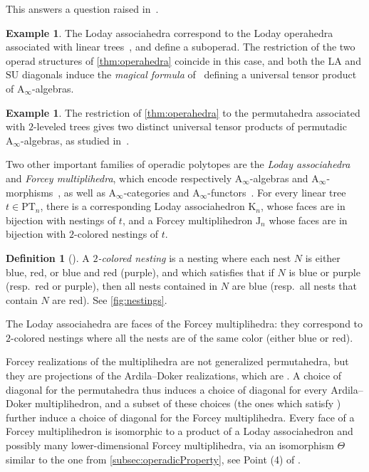 \documentclass{amsart}
\newcommand{\darkblue}{\color{darkblue}} %
\theoremstyle{definition}
\newtheorem{definition}[theorem]{Definition}
\newtheorem{example}[theorem]{Example}
\newcommand{\PT}{\mathrm{PT}} %
\newcommand{\K}{\mathrm{K}} %
\newcommand{\J}{\mathrm{J}} %
\newcommand{\resp}{resp.~} %
\newcommand{\defn}[1]{\textsl{\darkblue #1}} %
\newcommand{\SU}{\mathrm{SU}}
\newcommand{\LA}{\mathrm{LA}}
\newcommand{\Ainf}{\ensuremath{\mathrm{A}_\infty}}
\begin{document}
This answers a question raised in~\cite[Rem.~3.14]{LaplanteAnfossi}.

\begin{example}
The Loday associahedra correspond to the Loday operahedra associated with linear trees~\cite[Sect. 2.2]{LaplanteAnfossi}, and define a suboperad.
The restriction of the two operad structures of \cref{thm:operahedra} coincide in this case, and both the $\LA$ and $\SU$ diagonals induce the \emph{magical formula} of~\cite{MarklShnider, MasudaThomasTonksVallette, SaneblidzeUmble-comparingDiagonals} defining a universal tensor product of $\Ainf$-algebras. 
\end{example}

\begin{example}
The restriction of \cref{thm:operahedra} to the permutahedra associated with $2$-leveled trees gives two distinct universal tensor products of permutadic $\Ainf$-algebras, as studied in~\cite{LodayRonco-permutads,Markl}.
\end{example}

Two other important families of operadic polytopes are the \emph{Loday associahedra} and \emph{Forcey multiplihedra}, which encode respectively $\Ainf$-algebras and $\Ainf$-morphisms~\cite[Prop.~4.9]{LaplanteAnfossiMazuir}, as well as $\Ainf$-categories and $\Ainf$-functors~\cite[Sect.~4.3]{LaplanteAnfossiMazuir}.
For every linear tree $t \in \PT_n$, there is a corresponding Loday associahedron $\K_n$, whose faces are in bijection with nestings of $t$, and a Forcey multiplihedron $\J_n$ whose faces are in bijection with $2$-colored nestings of $t$.

\begin{definition}[{\cite[Def. 3.2]{LaplanteAnfossiMazuir}}]\label{def:2-Colored Nesting}
	A \defn{$2$-colored nesting} is a nesting where each nest $N$ is either blue, red, or blue and red (purple), and which satisfies that if $N$ is blue or purple (\resp red or purple), then all nests contained in $N$ are blue (\resp all nests that contain $N$ are red). 
 	See \cref{fig:nestings}.
\end{definition}

The Loday associahedra are faces of the Forcey multiplihedra: they correspond to $2$-colored nestings where all the nests are of the same color (either blue or red). 

Forcey realizations of the multiplihedra are not generalized permutahedra, but they are projections of the Ardila--Doker realizations, which are \cite[Prop. 1.16]{LaplanteAnfossiMazuir}.
A choice of diagonal for the permutahedra thus induces a choice of diagonal for every Ardila--Doker multiplihedron, and a subset of these choices (the ones which satisfy \cite[Prop. 2.7 \& 2.8]{LaplanteAnfossiMazuir}) further induce a choice of diagonal for the Forcey multiplihedra.
Every face of a Forcey multiplihedron is isomorphic to a product of a Loday associahedron and possibly many lower-dimensional Forcey multiplihedra, via an isomorphism $\Theta$ similar to the one from \cref{subsec:operadicProperty}, see Point (4) of \cite[Prop. 1.10]{LaplanteAnfossiMazuir}.
\end{document}
